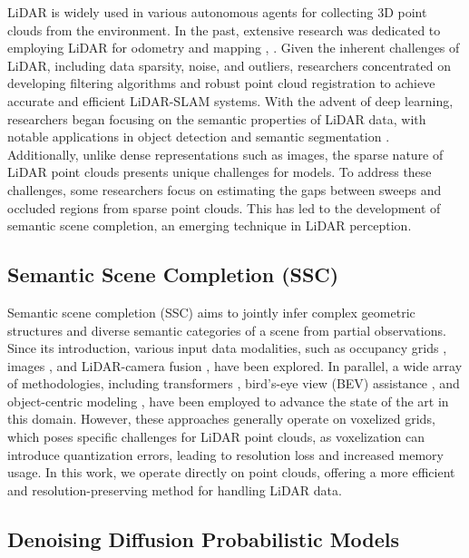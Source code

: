 \documentclass[conference]{IEEEtran}
\begin{document}
LiDAR is widely used in various autonomous agents for collecting 3D point clouds from the environment.
In the past, extensive research was dedicated to employing LiDAR for odometry \cite{cchoy} and mapping \cite{jquenzelands2020}, \cite{jgwak}.
Given the inherent challenges of LiDAR, including data sparsity, noise, and outliers, researchers concentrated on developing filtering algorithms \cite{ddroeschelands2020} and robust point cloud registration \cite{aq} to achieve accurate and efficient LiDAR-SLAM systems.
With the advent of deep learning, researchers began focusing on the semantic properties of LiDAR data, with notable applications in object detection \cite{xzhong2021} and semantic segmentation \cite{dp2023}.
Additionally, unlike dense representations such as images, the sparse nature of LiDAR point clouds presents unique challenges for models.
To address these challenges, some researchers focus on estimating the gaps between sweeps and occluded regions from sparse point clouds.
This has led to the development of semantic scene completion, an emerging technique in LiDAR perception.

\subsection{Semantic Scene Completion (SSC)}

Semantic scene completion (SSC) aims to jointly infer complex geometric structures and diverse semantic categories of a scene from partial observations.
Since its introduction, various input data modalities, such as occupancy grids \cite{jbehley2011}, images \cite{ivizzo2019}, and LiDAR-camera fusion \cite{zlyu2023}, have been explored.
In parallel, a wide array of methodologies, including transformers \cite{mwang2022}, bird's-eye view (BEV) assistance \cite{xyang2025}, and object-centric modeling \cite{yli2021}, have been employed to advance the state of the art in this domain.
However, these approaches generally operate on voxelized grids, which poses specific challenges for LiDAR point clouds, as voxelization can introduce quantization errors, leading to resolution loss and increased memory usage.
In this work, we operate directly on point clouds, offering a more efficient and resolution-preserving method for handling LiDAR data.

\subsection{Denoising Diffusion Probabilistic Models}
\end{document}
